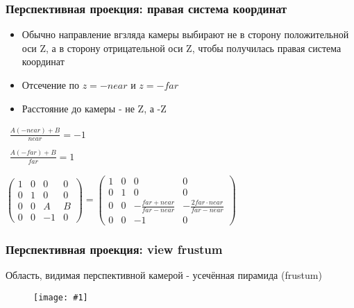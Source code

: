 \documentclass{beamer}
\newcommand{\slideimage}[1]{
  \begin{figure}
    \begin{adjustbox}{width=\textwidth, totalheight=\textheight-2\baselineskip-2\baselineskip,keepaspectratio}
      \texttt{[image: \#1]}
    \end{adjustbox}
  \end{figure}
}
\begin{document}
\begin{frame}[fragile]
\frametitle{Перспективная проекция: правая система координат}
\begin{itemize}
\item Обычно направление вгзляда камеры выбирают не в сторону положительной оси Z, а в сторону отрицательной оси Z, чтобы получилась правая система координат
\pause
\item Отсечение по \begin{math}z=-near\end{math} и \begin{math}z=-far\end{math}
\pause
\item Расстояние до камеры - не Z, а -Z
\end{itemize}
\pause
\begin{center}
\begin{math}
\begin{matrix}
\frac{A(-near)+B}{near} = -1 \\ \\
\frac{A(-far)+B}{far} = 1
\end{matrix}
\end{math}
\end{center}
\pause
\begin{center}
\begin{math}
\begin{pmatrix}
1 & 0 & 0 & 0 \\
0 & 1 & 0 & 0 \\
0 & 0 & A & B \\
0 & 0 & -1 & 0
\end{pmatrix}
=
\begin{pmatrix}
1 & 0 & 0 & 0 \\
0 & 1 & 0 & 0 \\
0 & 0 & -\frac{far + near}{far - near} & -\frac{2 far \cdot near}{far - near} \\
0 & 0 & -1 & 0
\end{pmatrix}
\end{math}
\end{center}
\end{frame}

\begin{frame}[fragile]
\frametitle{Перспективная проекция: view frustum}
Область, видимая перспективной камерой - усечённая пирамида (frustum)
\slideimage{frustum.png}
\end{frame}
\end{document}
